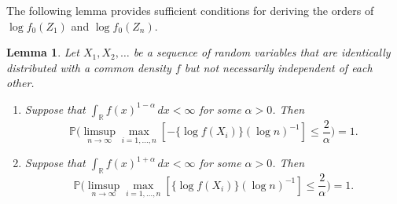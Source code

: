 \documentclass[12pt,letterpaper, twoside, openany]{article}
\theoremstyle{plain}
\newtheorem{lemma}[theorem]{Lemma}
\begin{document}
The following lemma provides sufficient conditions for deriving the orders of $\log f_0(Z_1)$ and $\log f_0(Z_n)$.
\begin{lemma}\label{lemma:suff_cond_logn}
Let $X_1,X_2,\ldots$ be a sequence of random variables that are identically distributed with a common density $f$ but not necessarily independent of each other. 	
\begin{enumerate}%
	\item [(i)]	Suppose that $\int_\mathbb{R} f(x)^{1- \alpha}\, dx  < \infty$ for some $\alpha > 0$. Then 
	\begin{equation}\label{eq:suff_cond_logn}
		\mathbb{P} \bigg(\limsup_{n \rightarrow \infty} \max_{i=1,\ldots,n} [ -  \{ \log f(X_i) \} (\log n)^{-1} ] \leq \frac{2}{\alpha} \bigg)=1.
	\end{equation}
	
	\item [(ii)] Suppose that $\int_\mathbb{R} f(x)^{1 + \alpha}\, dx  < \infty$ for some $\alpha > 0$. Then 
	\begin{equation}\label{eq:suff_cond_logn2}
		\mathbb{P} \bigg(\limsup_{n \rightarrow \infty} \max_{i=1,\ldots,n} [  \{\log f(X_i)\} (\log n)^{-1} ] \leq \frac{2}{\alpha} \bigg)=1.
	\end{equation}
\end{enumerate}	
\end{lemma}
\end{document}
